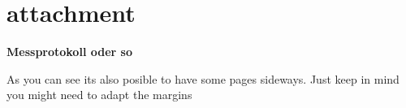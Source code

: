 \documentclass[	%
		11pt,a4paper,	%
		twoside,		%
		english,		%
		f1				%
	]{HsH-report}		%
\begin{document}
\clearpage
{} %
\recalctypearea
\chapter{attachment}
\textbf{\Large{Messprotokoll oder so}} %

As you can see its also posible to have some pages sideways. Just keep in mind you might need to adapt the margins

\newpage
{} %
\recalctypearea

\printbibliography
\noindent\begin{minipage}{\textwidth} %
	\listoffigures
	\listoftables
\end{minipage}
\end{document}
